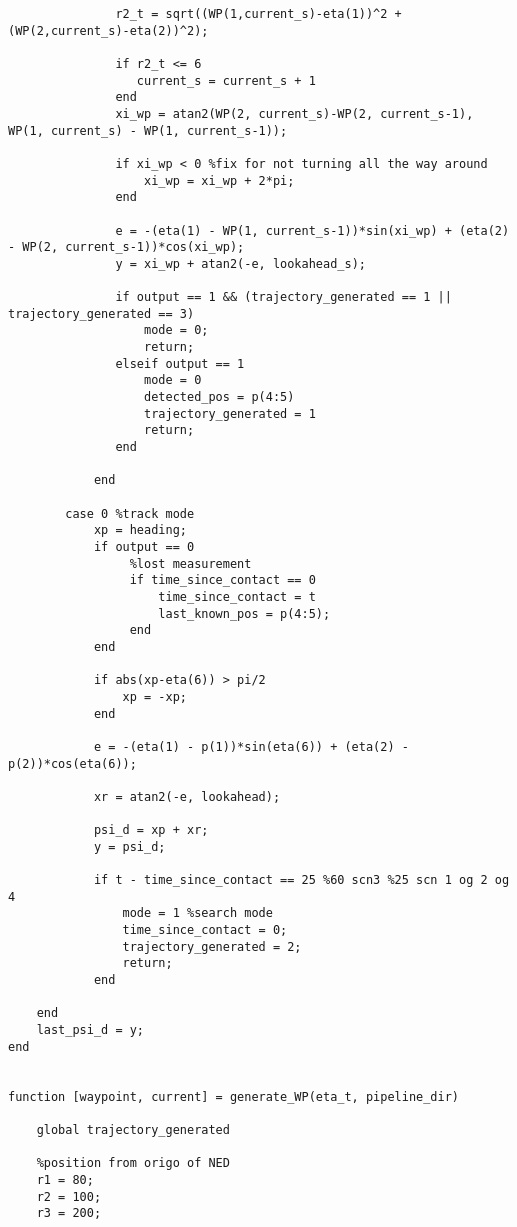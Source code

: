 \begin{lstlisting}
               r2_t = sqrt((WP(1,current_s)-eta(1))^2 + (WP(2,current_s)-eta(2))^2);
               
               if r2_t <= 6
                  current_s = current_s + 1
               end
               xi_wp = atan2(WP(2, current_s)-WP(2, current_s-1), WP(1, current_s) - WP(1, current_s-1));
               
               if xi_wp < 0 %fix for not turning all the way around
                   xi_wp = xi_wp + 2*pi;
               end
               
               e = -(eta(1) - WP(1, current_s-1))*sin(xi_wp) + (eta(2) - WP(2, current_s-1))*cos(xi_wp);
               y = xi_wp + atan2(-e, lookahead_s);
               
               if output == 1 && (trajectory_generated == 1 || trajectory_generated == 3)
                   mode = 0;
                   return;
               elseif output == 1
                   mode = 0
                   detected_pos = p(4:5)
                   trajectory_generated = 1
                   return;
               end
               
            end

        case 0 %track mode
            xp = heading;
            if output == 0
                 %lost measurement
                 if time_since_contact == 0
                     time_since_contact = t
                     last_known_pos = p(4:5);
                 end
            end
            
            if abs(xp-eta(6)) > pi/2
                xp = -xp;
            end

            e = -(eta(1) - p(1))*sin(eta(6)) + (eta(2) - p(2))*cos(eta(6));

            xr = atan2(-e, lookahead);

            psi_d = xp + xr;
            y = psi_d;
            
            if t - time_since_contact == 25 %60 scn3 %25 scn 1 og 2 og 4
                mode = 1 %search mode
                time_since_contact = 0;
                trajectory_generated = 2;
                return;
            end 

    end
    last_psi_d = y;
end


function [waypoint, current] = generate_WP(eta_t, pipeline_dir)
    
    global trajectory_generated
    
    %position from origo of NED
    r1 = 80;
    r2 = 100;
    r3 = 200;
     

\end{lstlisting}
